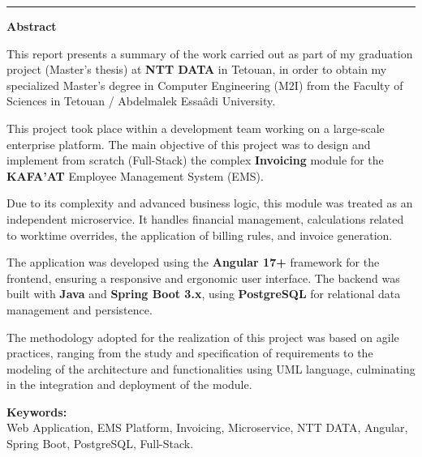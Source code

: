 \documentclass[12pt, a4paper, openany]{report}
\begin{document}
\vspace{0.0cm}

\vspace{0.1cm}


\newpage
\thispagestyle{frontmatter} 
{} 

\vspace*{0.5cm} 


\noindent
\textcolor{royalBlue}{\rule{0.65\textwidth}{1pt}}
\hfill
{\fontsize{24}{28}\selectfont\color{royalBlue}\bfseries Abstract}

\vspace{0.0cm}


\begin{large}
\setlength{\parskip}{0.3cm} 
\renewcommand{\baselinestretch}{1.3}\selectfont 

This report presents a summary of the work carried out as part of my graduation project (Master's thesis) at \textbf{NTT DATA} in Tetouan, in order to obtain my specialized Master's degree in Computer Engineering (M2I) from the Faculty of Sciences in Tetouan / Abdelmalek Essaâdi University.

This project took place within a development team working on a large-scale enterprise platform. The main objective of this project was to design and implement from scratch (Full-Stack) the complex \textbf{Invoicing} module for the \textbf{KAFA'AT} Employee Management System (EMS).

Due to its complexity and advanced business logic, this module was treated as an independent microservice. It handles financial management, calculations related to worktime overrides, the application of billing rules, and invoice generation.

The application was developed using the \textbf{Angular 17+} framework for the frontend, ensuring a responsive and ergonomic user interface. The backend was built with \textbf{Java} and \textbf{Spring Boot 3.x}, using \textbf{PostgreSQL} for relational data management and persistence.

The methodology adopted for the realization of this project was based on agile practices, ranging from the study and specification of requirements to the modeling of the architecture and functionalities using UML language, culminating in the integration and deployment of the module.

\vspace{0cm}

\noindent\textbf{Keywords:} \\
Web Application, EMS Platform, Invoicing, Microservice, NTT DATA, Angular, Spring Boot, PostgreSQL, Full-Stack.

\end{large}
\end{document}
